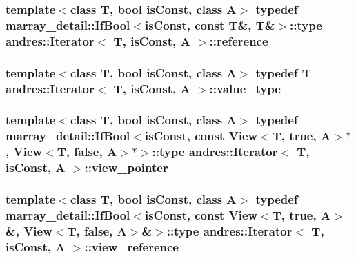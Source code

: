 \subsubsection[{reference}]{\setlength{\rightskip}{0pt plus 5cm}template$<$class T, bool is\+Const, class A$>$ typedef marray\+\_\+detail\+::\+If\+Bool$<$is\+Const, const T\&, T\&$>$\+::type {\bf andres\+::\+Iterator}$<$ T, is\+Const, A $>$\+::{\bf reference}}\label{classandres_1_1Iterator_a9805f26813688f04c33e798f7999e5f7}
\hypertarget{classandres_1_1Iterator_a3fd8a072268f4ad5c55963a6ea6d7a65}{}
\subsubsection[{value\+\_\+type}]{\setlength{\rightskip}{0pt plus 5cm}template$<$class T, bool is\+Const, class A$>$ typedef T {\bf andres\+::\+Iterator}$<$ T, is\+Const, A $>$\+::{\bf value\+\_\+type}}\label{classandres_1_1Iterator_a3fd8a072268f4ad5c55963a6ea6d7a65}
\hypertarget{classandres_1_1Iterator_a937adfd36b5e7b01be53d16bd823af12}{}
\subsubsection[{view\+\_\+pointer}]{\setlength{\rightskip}{0pt plus 5cm}template$<$class T, bool is\+Const, class A$>$ typedef marray\+\_\+detail\+::\+If\+Bool$<$is\+Const, const {\bf View}$<$T, true, A$>$$\ast$, {\bf View}$<$T, false, A$>$$\ast$$>$\+::type {\bf andres\+::\+Iterator}$<$ T, is\+Const, A $>$\+::{\bf view\+\_\+pointer}}\label{classandres_1_1Iterator_a937adfd36b5e7b01be53d16bd823af12}
\hypertarget{classandres_1_1Iterator_aba3b6dd25a055f0aaa7a931657f86a89}{}
\subsubsection[{view\+\_\+reference}]{\setlength{\rightskip}{0pt plus 5cm}template$<$class T, bool is\+Const, class A$>$ typedef marray\+\_\+detail\+::\+If\+Bool$<$is\+Const, const {\bf View}$<$T, true, A$>$\&, {\bf View}$<$T, false, A$>$\&$>$\+::type {\bf andres\+::\+Iterator}$<$ T, is\+Const, A $>$\+::{\bf view\+\_\+reference}}\label{classandres_1_1Iterator_aba3b6dd25a055f0aaa7a931657f86a89}


